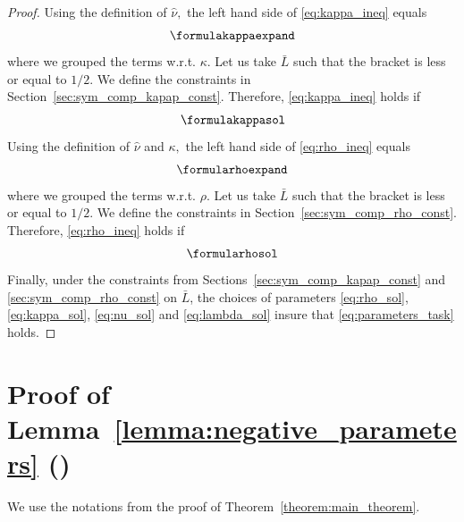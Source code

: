\documentclass{article} %
\theoremstyle{plain}
\theoremstyle{definition}
\theoremstyle{remark}
\begin{document}
\begin{proof}
    Using the definition of $\widehat{\nu},$ the left hand side of \eqref{eq:kappa_ineq} equals
    \begin{dmath}
      \formulakappaexpand
    \end{dmath}
    where we grouped the terms w.r.t. $\kappa.$ Let us take $\bar{L}$ such that the bracket is less or equal to $1 / 2.$ We define the constraints in Section~\ref{sec:sym_comp_kapap_const}.
    Therefore, \eqref{eq:kappa_ineq} holds if
    \begin{align}
      \formulakappasol
    \end{align}
    Using the definition of $\widehat{\nu}$ and $\kappa,$ the left hand side of \eqref{eq:rho_ineq} equals
    \begin{dmath}
      \formularhoexpand
    \end{dmath}
    where we grouped the terms w.r.t. $\rho.$ Let us take $\bar{L}$ such that the bracket is less or equal to $1 / 2.$ We define the constraints in Section~\ref{sec:sym_comp_rho_const}.
    Therefore, \eqref{eq:rho_ineq} holds if
    \begin{align}
      \formularhosol
    \end{align}
    Finally, under the constraints from Sections~\ref{sec:sym_comp_kapap_const} and \ref{sec:sym_comp_rho_const} on $\bar{L}$, the choices of parameters \eqref{eq:rho_sol}, \eqref{eq:kappa_sol}, \eqref{eq:nu_sol} and \eqref{eq:lambda_sol} insure that \eqref{eq:parameters_task} holds.
\end{proof}

\section{Proof of Lemma~\ref{lemma:negative_parameters} ()}
\label{sec:negative_parameters}

We use the notations from the proof of Theorem~\ref{theorem:main_theorem}.
\LEMMANEGATIVETERMS*
\end{document}
